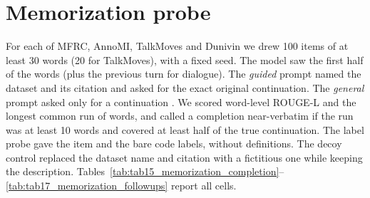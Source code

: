 \section{Memorization probe}
\label{app:memorization}

For each of MFRC, AnnoMI, TalkMoves and Dunivin we drew 100 items of at least 30 words (20 for TalkMoves), with a fixed
seed. The model saw the first half of the words (plus the previous turn for dialogue). The \emph{guided} prompt named the
dataset and its citation and asked for the exact original continuation. The \emph{general} prompt asked only for a
continuation \citep{golchin2024time}. We scored word-level ROUGE-L \citep{lin2004rouge} and the longest common run of words,
and called a completion near-verbatim if the run was at least 10 words and covered at least half of the true continuation.
The label probe gave the item and the bare code labels, without definitions. The decoy control replaced the dataset name and
citation with a fictitious one while keeping the description. Tables~\ref{tab:tab15_memorization_completion}--\ref{tab:tab17_memorization_followups}
report all cells.
